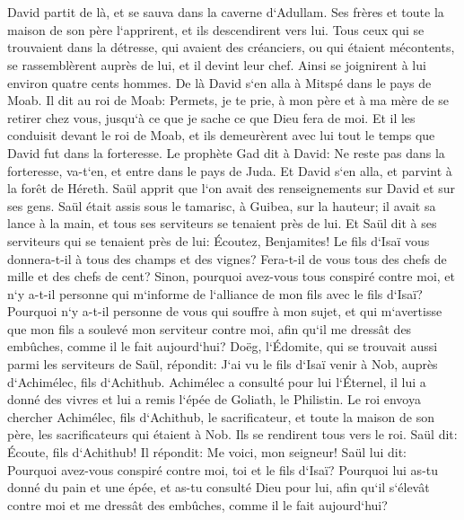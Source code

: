 \chapter{}

\verse David partit de là, et se sauva dans la caverne d`Adullam. Ses frères et toute la maison de son père l`apprirent, et ils descendirent vers lui. 
\verse Tous ceux qui se trouvaient dans la détresse, qui avaient des créanciers, ou qui étaient mécontents, se rassemblèrent auprès de lui, et il devint leur chef. Ainsi se joignirent à lui environ quatre cents hommes. 
\verse De là David s`en alla à Mitspé dans le pays de Moab. Il dit au roi de Moab: Permets, je te prie, à mon père et à ma mère de se retirer chez vous, jusqu`à ce que je sache ce que Dieu fera de moi. 
\verse Et il les conduisit devant le roi de Moab, et ils demeurèrent avec lui tout le temps que David fut dans la forteresse. 
\verse Le prophète Gad dit à David: Ne reste pas dans la forteresse, va-t`en, et entre dans le pays de Juda. Et David s`en alla, et parvint à la forêt de Héreth. 
\verse Saül apprit que l`on avait des renseignements sur David et sur ses gens. Saül était assis sous le tamarisc, à Guibea, sur la hauteur; il avait sa lance à la main, et tous ses serviteurs se tenaient près de lui. 
\verse Et Saül dit à ses serviteurs qui se tenaient près de lui: Écoutez, Benjamites! Le fils d`Isaï vous donnera-t-il à tous des champs et des vignes? Fera-t-il de vous tous des chefs de mille et des chefs de cent? 
\verse Sinon, pourquoi avez-vous tous conspiré contre moi, et n`y a-t-il personne qui m`informe de l`alliance de mon fils avec le fils d`Isaï? Pourquoi n`y a-t-il personne de vous qui souffre à mon sujet, et qui m`avertisse que mon fils a soulevé mon serviteur contre moi, afin qu`il me dressât des embûches, comme il le fait aujourd`hui? 
\verse Doëg, l`Édomite, qui se trouvait aussi parmi les serviteurs de Saül, répondit: J`ai vu le fils d`Isaï venir à Nob, auprès d`Achimélec, fils d`Achithub. 
\verse Achimélec a consulté pour lui l`Éternel, il lui a donné des vivres et lui a remis l`épée de Goliath, le Philistin. 
\verse Le roi envoya chercher Achimélec, fils d`Achithub, le sacrificateur, et toute la maison de son père, les sacrificateurs qui étaient à Nob. Ils se rendirent tous vers le roi. 
\verse Saül dit: Écoute, fils d`Achithub! Il répondit: Me voici, mon seigneur! 
\verse Saül lui dit: Pourquoi avez-vous conspiré contre moi, toi et le fils d`Isaï? Pourquoi lui as-tu donné du pain et une épée, et as-tu consulté Dieu pour lui, afin qu`il s`élevât contre moi et me dressât des embûches, comme il le fait aujourd`hui? 
